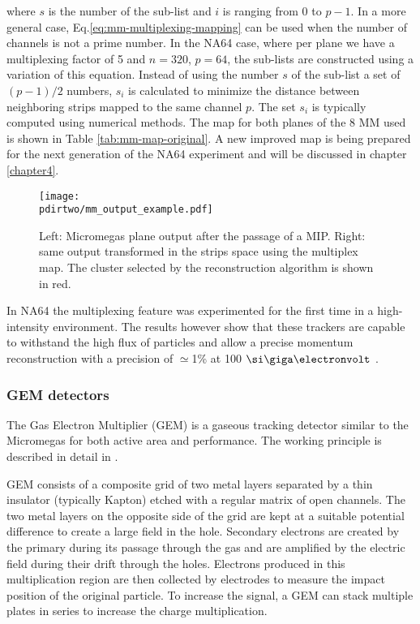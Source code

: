 where $s$ is the number of the sub-list and $i$ is ranging from 0 to $p-1$. In a more general case, Eq.\ref{eq:mm-multiplexing-mapping} can be used when the number of channels is not a prime number. In the NA64 case, where per plane we have a multiplexing factor of 5 and $n=320$, $p=64$, the sub-lists are constructed using a variation of this equation. Instead of using the number $s$ of the sub-list a set of $(p-1)/2$ numbers, $s_i$ is calculated to minimize the distance between neighboring strips mapped to the same channel $p$. The set $s_i$ is typically computed using numerical methods. The map for both planes of the 8 MM used is shown in Table \ref{tab:mm-map-original}. A new improved map is being prepared for the next generation of the NA64 experiment and will be discussed in chapter \ref{chapter4}.

\begin{figure}[bth!]
  \centering
  \texttt{[image: \\pdirtwo/mm\_output\_example.pdf]}
\caption[Example of the readout of a multiplexing detector]{Left: Micromegas plane output after the passage of a MIP. Right: same output transformed in the strips space using the multiplex map. The cluster selected by the reconstruction algorithm is shown in red.}
\label{fig:multiplexing-example}
\end{figure}

In NA64 the multiplexing feature was experimented for the first time in a high-intensity environment. The results however show that these trackers are capable to withstand the high flux of particles and allow a precise momentum reconstruction with a precision of $\simeq$1\% at 100 $\gev$ \cite{Banerjee:2017mdu}.

\subsubsection{GEM detectors}
\label{ch2:sec:gem}
The Gas Electron Multiplier (GEM) is a gaseous tracking detector similar to the Micromegas for both active area and performance. The working principle is described in detail in \cite{gem,SAULI20162,ABBON2007455}.

GEM consists of a composite grid of two metal layers separated by a thin insulator (typically Kapton) etched with a regular matrix of open channels. The two metal layers on the opposite side of the grid are kept at a suitable potential difference to create a large field in the hole. Secondary electrons are created by the primary during its passage through the gas and are amplified by the electric field during their drift through the holes. Electrons produced in this multiplication region are then collected by electrodes to measure the impact position of the original particle. To increase the signal, a GEM can stack multiple plates in series to increase the charge multiplication.

